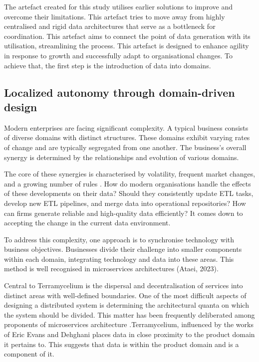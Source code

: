 \documentclass[preprint,12pt]{elsarticle}
\begin{document}
The artefact created for this study utilises earlier solutions to improve and overcome their limitations. This artefact tries to move away from highly centralised and rigid data architectures that serve as a bottleneck for coordination. This artefact aims to connect the point of data generation with its utilisation, streamlining the process. This artefact is designed to enhance agility in response to growth and successfully adapt to organisational changes. To achieve that, the first step is the introduction of data into domains. 

\subsection{Localized autonomy through domain-driven design}

Modern enterprises are facing significant complexity. A typical business consists of diverse domains with distinct structures. These domains exhibit varying rates of change and are typically segregated from one another. The business's overall synergy is determined by the relationships and evolution of various domains. 

The core of these synergies is characterised by volatility, frequent market changes, and a growing number of rules \cite{popovivc2018impact}. How do modern organisations handle the effects of these developments on their data? Should they consistently update ETL tasks, develop new ETL pipelines, and merge data into operational repositories? How can firms generate reliable and high-quality data efficiently? It comes down to accepting the change in the current data environment. 

To address this complexity, one approach is to synchronise technology with business objectives. Businesses divide their challenge into smaller components within each domain, integrating technology and data into these areas. This method is well recognised in microservices architectures (Ataei, 2023). 

Central to Terramycelium is the dispersal and decentralisation of services into distinct areas with well-defined boundaries. One of the most difficult aspects of designing a distributed system is determining the architectural quanta on which the system should be divided. This matter has been frequently deliberated among proponents of microservices architecture \cite{merson2020modeling}.Terramycelium, influenced by the works of Eric Evans \cite{evans2004domain} and Dehghani \cite{DataMesh} places data in close proximity to the product domain it pertains to. This suggests that data is within the product domain and is a component of it.
\end{document}
